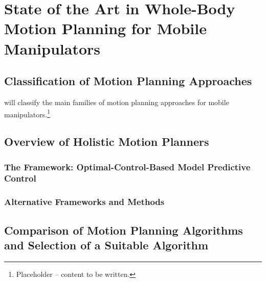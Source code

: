 \chapter{State of the Art in Whole-Body Motion Planning for Mobile
  Manipulators}
\label{ch:sota}

\section{Classification of Motion Planning Approaches}
\label{sec:sota-classification}

 will classify the main families of motion
planning approaches for mobile manipulators.\footnote{Placeholder --
content to be written.}

\section{Overview of Holistic Motion Planners}
\label{sec:sota-holistic}


\subsection{The \ocs{} Framework: Optimal-Control-Based Model Predictive
  Control}
\label{sec:sota-ocs2}


\subsection{Alternative Frameworks and Methods}
\label{sec:sota-alternatives}


\section{Comparison of Motion Planning Algorithms and Selection of a
  Suitable Algorithm}
\label{sec:sota-selection}

